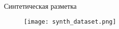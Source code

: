 
\begin{frame}{Синтетическая разметка}
\begin{figure}
\centering
\texttt{[image: synth\_dataset.png]}
\end{figure}
\end{frame}